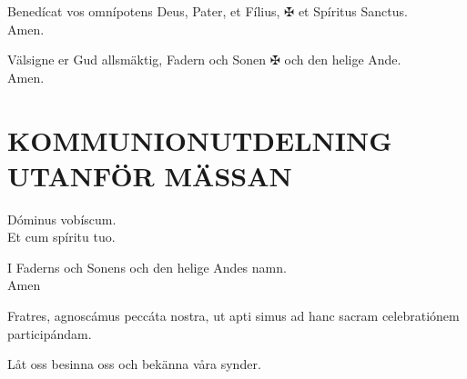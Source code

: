 \smallskip
{}
\smallskip

\begin{multicols}{2}
\renewcommand{\columnseprulecolor}{\color{rubrica}}
\renewcommand{\columnseprule}{0.4pt}
\va Benedícat vos omnípotens Deus, Pater, et Fílius, {\color{rubrica} $\maltese$} et Spíritus Sanctus.\\
\ra Amen.
\columnbreak

\va Välsigne er Gud allsmäktig, Fadern och Sonen {\color{rubrica} $\maltese$} och den helige Ande.\\
\ra Amen.
\end{multicols}

\newpage


\chapter{KOMMUNIONUTDELNING UTANFÖR MÄSSAN}


\begin{multicols}{2}
\renewcommand{\columnseprulecolor}{\color{rubrica}}
\renewcommand{\columnseprule}{0.4pt}

\va Dóminus vobíscum.\\
\ra Et cum spíritu tuo.

\columnbreak

\va I Faderns och Sonens och den helige Andes namn.\\
\ra Amen
\end{multicols}

\smallskip
{}

\begin{multicols}{2}
\renewcommand{\columnseprulecolor}{\color{rubrica}}
\renewcommand{\columnseprule}{0.4pt}
\va Fratres, agnoscámus peccáta nostra, ut apti simus ad hanc sacram
celebratiónem participándam.

\columnbreak

\va Låt oss besinna oss och bekänna våra synder.
\end{multicols}

\smallskip
{}
\smallskip

